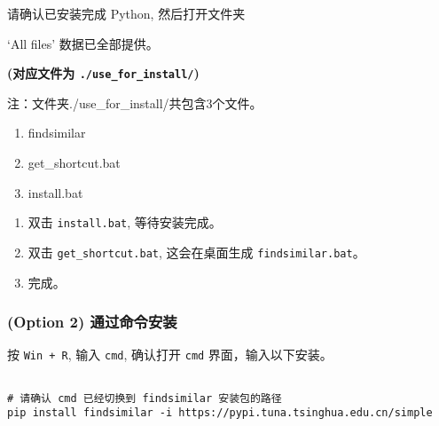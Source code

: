 \documentclass[
]{article}
\providecommand{\tightlist}{%
  \setlength{\itemsep}{0pt}\setlength{\parskip}{0pt}}
\begin{document}
请确认已安装完成 Python, 然后打开文件夹

\begin{center}\vspace{1.5cm}\end{center}

`All files' 数据已全部提供。

\textbf{(对应文件为 \texttt{./use\_for\_install/})}

\begin{center}\begin{tcolorbox}[colback=gray!10, colframe=gray!50, width=0.9\linewidth, arc=1mm, boxrule=0.5pt]注：文件夹./use\_for\_install/共包含3个文件。

\begin{enumerate}\tightlist
\item findsimilar
\item get\_shortcut.bat
\item install.bat
\end{enumerate}\end{tcolorbox}
\end{center}

\begin{center}\vspace{1.5cm}\end{center}

\begin{enumerate}
\def\labelenumi{\arabic{enumi}.}
\tightlist
\item
  双击 \texttt{install.bat}, 等待安装完成。
\item
  双击 \texttt{get\_shortcut.bat}, 这会在桌面生成 \texttt{findsimilar.bat}。
\item
  完成。
\end{enumerate}

\hypertarget{option-2-ux901aux8fc7ux547dux4ee4ux5b89ux88c5}{%
\subsubsection{(Option 2) 通过命令安装}\label{option-2-ux901aux8fc7ux547dux4ee4ux5b89ux88c5}}

按 \texttt{Win\ +\ R}, 输入 \texttt{cmd}, 确认打开 \texttt{cmd} 界面，输入以下安装。

\begin{tcolorbox}[colback = gray!10, colframe = red!50, width = 16cm, arc = 1mm, auto outer arc, title = {cmd input}]
\begin{verbatim}

# 请确认 cmd 已经切换到 findsimilar 安装包的路径
pip install findsimilar -i https://pypi.tuna.tsinghua.edu.cn/simple

\end{verbatim}
\end{tcolorbox}
\end{document}
